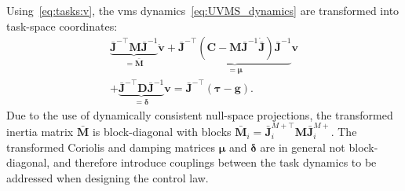 \documentclass[../main.tex]{subfiles}
\begin{document}
Using~\eqref{eq:tasks:v}, the \gls{vms} dynamics~\eqref{eq:UVMS_dynamics} are transformed into task-space coordinates:
\begin{equation}\label{eq:tasks:v_dyn}
    \begin{split}
        \underbrace{\bar{\bm{J}}^{-\top} \bm{M} \bar{\bm{J}}^{-1}}_{= \bar{\bm{M}}} \dot{\bm{v}} + \underbrace{\bar{\bm{J}}^{-\top} \left( \bm{C} -  \bm{M} \bar{\bm{J}}^{-1} \dot{\bar{\bm{J}}} \right) \bar{\bm{J}}^{-1}}_{=\bm{\mu}} \bm{v} \\
        + \underbrace{\bar{\bm{J}}^{-\top} \bm{D} \bar{\bm{J}}^{-1}}_{= \bm{\delta}} \bm{v}  = \bar{\bm{J}}^{-\top} \left( \bm{\tau} - \bm{g} \right) .
    \end{split}
\end{equation}
Due to the use of dynamically consistent null-space projections, the transformed inertia matrix $\bar{\bm{M}}$ is block-diagonal with blocks $\bar{\bm{M}}_i = \bar{\bm{J}}^{M+\top}_i \bm{M} \bar{\bm{J}}^{M+}_i$. The transformed Coriolis and damping matrices $\bm{\mu}$ and $\bm{\delta}$ are in general not block-diagonal, and therefore introduce couplings between the task dynamics to be addressed when designing the control law.
\end{document}
